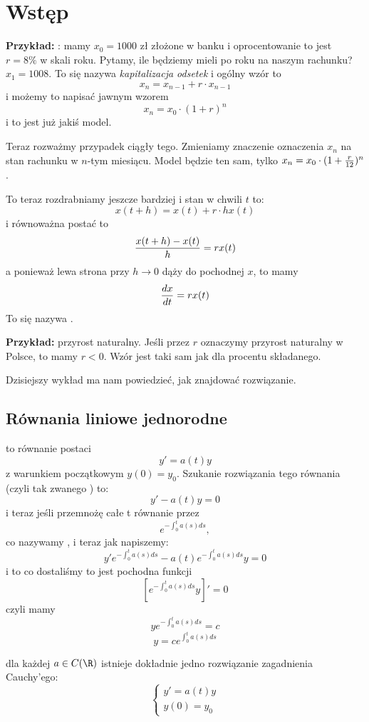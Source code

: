 \section{Wstęp}

\textbf{Przykład:} : mamy $x_0=1000$ zł złożone w banku i oprocentowanie to jest $r = 8\%$ w skali roku. Pytamy, ile będziemy mieli po roku na naszym rachunku? $x_1=1008$. To się nazywa \emph{kapitalizacja odsetek} i ogólny wzór to
$$x_n=x_{n-1}+r\cdot x_{n-1}$$
i możemy to napisać jawnym wzorem
$$x_n=x_0\cdot(1+r)^n$$
i to jest już jakiś model. 

Teraz rozważmy przypadek ciągły tego. Zmieniamy znaczenie oznaczenia $x_n$ na stan rachunku w $n$-tym miesiącu. Model będzie ten sam, tylko $x_n=x_0\cdot(1+{r\over12})^n$.

To teraz rozdrabniamy jeszcze bardziej i stan w chwili $t$ to:
$$x(t+h)=x(t)+r\cdot h x(t)$$
i równoważna postać to
$${x(t+h)-x(t)\over h}=rx(t)$$
a ponieważ lewa strona przy $h\to 0$ dąży do pochodnej $x$, to mamy
$${dx\over dt}=rx(t)$$
To się nazywa .
\smallskip

\textbf{Przykład:} przyrost naturalny. Jeśli przez $r$ oznaczymy przyrost naturalny w Polsce, to mamy $r<0$. Wzór jest taki sam jak dla procentu składanego.

Dzisiejszy wykład ma nam powiedzieć, jak znajdować rozwiązanie.

\subsection{Równania liniowe jednorodne}

 to równanie postaci
$$y'=a(t)y$$
z warunkiem początkowym $y(0)=y_0$. Szukanie rozwiązania tego równania (czyli tak zwanego ) to:
$$y'-a(t)y=0$$
i teraz jeśli przemnożę całe t równanie przez
$$e^{-\int_0^t a(s)ds},$$
co nazywamy , i teraz jak napiszemy:
$$y'e^{-\int_0^ta(s)ds}-a(t)e^{-\int_0^ta(s)ds}y=0$$
i to co dostaliśmy to jest pochodna funkcji
$$\left[e^{-\int_0^ta(s)ds}y\right]'=0$$
czyli mamy
$$ye^{-\int_0^ta(s)ds}=c$$
$$y=ce^{\int_0^ta(s)ds}$$

 dla każdej $a\in C(\R)$ istnieje dokładnie jedno rozwiązanie zagadnienia Cauchy'ego:
$$\begin{cases}
    y'=a(t)y\\
    y(0)=y_0
\end{cases}$$

